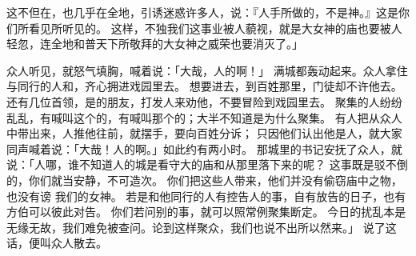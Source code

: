 {这{}不但在{}，也几乎在{}全地，引诱迷惑许多人，说：『人手所做的，不是神。』这是你们所看见所听见的。
这样，不独我们这事业被人藐视，就是大女神{}的庙也要被人轻忽，连{}全地和普天下所敬拜的大女神之威荣也要消灭了。」
\par }{\PP {}众人听见，就怒气填胸，喊着说：「大哉，{}人的{}啊！」
满城都轰动起来。众人拿住与{}同行的{}人{}和{}，齐心拥进戏园里去。
想要进去，到百姓那里，门徒却不许他去。
还有{}几位首领，是{}的朋友，打发人来劝他，不要冒险到戏园里去。
聚集的人纷纷乱乱，有喊叫这个的，有喊叫那个的；大半不知道是为什么聚集。
有人把{}从众人中带出来，{}人推他往前，{}就摆手，要向百姓分诉；
只因他们认出他是{}人，就大家同声喊着说：「大哉！{}人的{}啊。」如此约有两小时。
那城里的书记安抚了众人，就说：「{}人哪，谁不知道{}人的城是看守大{}的庙和从{}那里落下来的{}呢？
这事既是驳不倒的，你们就当安静，不可造次。
你们把这些人带来，他们并没有偷窃庙中之物，也没有谤 我们的女神。
若是{}和他同行的人有控告人的事，自有放告的日子，也有方伯可以彼此对告。
你们若问别的事，就可以照常例聚集断定。
今日的扰乱本是无缘无故，我们难免被查问。论到这样聚众，我们也说不出所以然来。」
说了这话，便叫众人散去。

}
